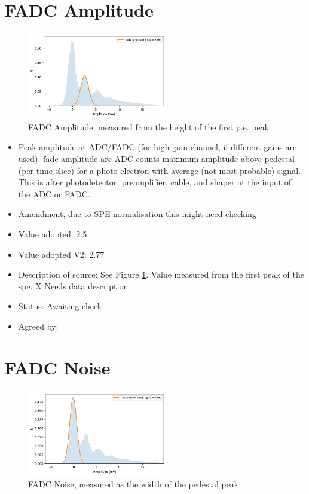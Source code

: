 \documentclass[GCT,short]{gct}
\begin{document}
\section{FADC Amplitude }

\begin{figure}
\centering
\includegraphics[width=0.55\textwidth]{../37_fadcAmplitude/checs_fadc_amplitude_v2.pdf} 
\caption{FADC Amplitude, measured from the height of the first p.e. peak}
\label{fig:fadcamp}
\end{figure}

\begin{itemize}
\item Peak amplitude at ADC/FADC (for high gain channel, if different gains are used). fadc amplitude are ADC counts maximum amplitude above pedestal (per time slice) for a photo-electron with average (not most probable) signal. This is after photodetector, preamplifier, cable, and shaper at the input of the ADC or FADC.
\item Amendment, due to SPE normalisation this might need checking
\item Value adopted: 2.5
\item Value adopted V2: 2.77
\item Description of source: See Figure \ref{fig:fadcamp}. Value measured from the first peak of the spe. \color{red} X Needs data description \color{black}
\item Status: \color{red}Awaiting check\color{black}
\item Agreed by: 
\end{itemize}

\section{FADC Noise }

\begin{figure}
\centering
\includegraphics[width=0.55\textwidth]{../38_fadcNoise/checs_fadc_noise_v2.pdf} 
\caption{FADC Noise, measured as the width of the pedestal peak}
\label{fig:fadcnoise}
\end{figure}
\end{document}
